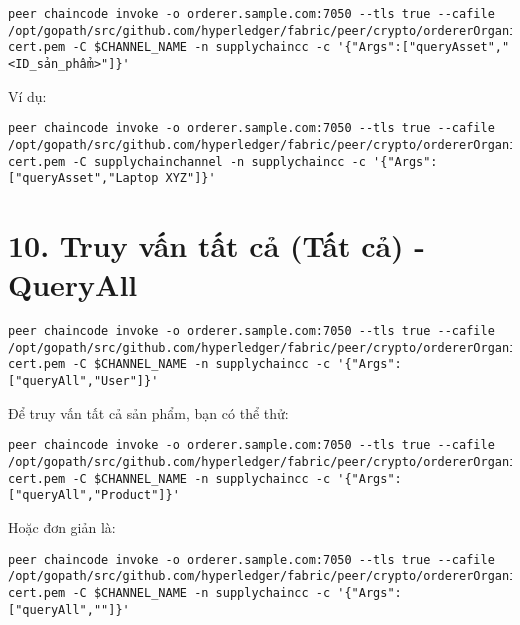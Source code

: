 \documentclass{article}
\begin{document}
\begin{lstlisting}[breaklines=true]
peer chaincode invoke -o orderer.sample.com:7050 --tls true --cafile /opt/gopath/src/github.com/hyperledger/fabric/peer/crypto/ordererOrganizations/sample.com/orderers/orderer.sample.com/msp/tlscacerts/tlsca.sample.com-cert.pem -C $CHANNEL_NAME -n supplychaincc -c '{"Args":["queryAsset","<ID_sản_phẩm>"]}'
\end{lstlisting}

Ví dụ:

\begin{lstlisting}[breaklines=true]
peer chaincode invoke -o orderer.sample.com:7050 --tls true --cafile /opt/gopath/src/github.com/hyperledger/fabric/peer/crypto/ordererOrganizations/sample.com/orderers/orderer.sample.com/msp/tlscacerts/tlsca.sample.com-cert.pem -C supplychainchannel -n supplychaincc -c '{"Args":["queryAsset","Laptop XYZ"]}'
\end{lstlisting}

\section{10. Truy vấn tất cả (Tất cả) - QueryAll}

\begin{lstlisting}[breaklines=true]
peer chaincode invoke -o orderer.sample.com:7050 --tls true --cafile /opt/gopath/src/github.com/hyperledger/fabric/peer/crypto/ordererOrganizations/sample.com/orderers/orderer.sample.com/msp/tlscacerts/tlsca.sample.com-cert.pem -C $CHANNEL_NAME -n supplychaincc -c '{"Args":["queryAll","User"]}'
\end{lstlisting}

Để truy vấn tất cả sản phẩm, bạn có thể thử:

\begin{lstlisting}[breaklines=true]
peer chaincode invoke -o orderer.sample.com:7050 --tls true --cafile /opt/gopath/src/github.com/hyperledger/fabric/peer/crypto/ordererOrganizations/sample.com/orderers/orderer.sample.com/msp/tlscacerts/tlsca.sample.com-cert.pem -C $CHANNEL_NAME -n supplychaincc -c '{"Args":["queryAll","Product"]}'
\end{lstlisting}

Hoặc đơn giản là:

\begin{lstlisting}[breaklines=true]
peer chaincode invoke -o orderer.sample.com:7050 --tls true --cafile /opt/gopath/src/github.com/hyperledger/fabric/peer/crypto/ordererOrganizations/sample.com/orderers/orderer.sample.com/msp/tlscacerts/tlsca.sample.com-cert.pem -C $CHANNEL_NAME -n supplychaincc -c '{"Args":["queryAll",""]}'
\end{lstlisting}
\end{document}
